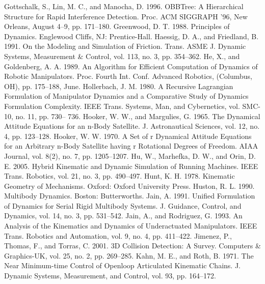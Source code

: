 Gottschalk, S., Lin, M. C., and Manocha, D. 1996. OBBTree: A Hierarchical Structure for Rapid Interference Detection. Proc. ACM SIGGRAPH ’96, New Orleans, August 4–9, pp. 171–180. Greenwood, D. T. 1988. Principles of Dynamics. Englewood Cliffs, NJ: Prentice-Hall. Haessig, D. A., and Friedland, B. 1991. On the Modeling and Simulation of Friction. Trans. ASME J. Dynamic Systems, Measurement \& Control, vol. 113, no. 3, pp. 354–362. He, X., and Goldenberg, A. A. 1989. An Algorithm for Efficient Computation of Dynamics of Robotic Manipulators. Proc. Fourth Int. Conf. Advanced Robotics, (Columbus, OH), pp. 175–188, June. Hollerbach, J. M. 1980. A Recursive Lagrangian Formulation of Manipulator Dynamics and a Comparative Study of Dynamics Formulation Complexity. IEEE Trans. Systems, Man, and Cybernetics, vol. SMC-10, no. 11, pp. 730– 736. Hooker, W. W., and Margulies, G. 1965. The Dynamical Attitude Equations for an n-Body Satellite. J. Astronautical Sciences, vol. 12, no. 4, pp. 123–128. Hooker, W. W. 1970. A Set of r Dynamical Attitude Equations for an Arbitrary n-Body Satellite having r Rotational Degrees of Freedom. AIAA Journal, vol. 8(2), no. 7, pp. 1205–1207. Hu, W., Marhefka, D. W., and Orin, D. E. 2005. Hybrid Kinematic and Dynamic Simulation of Running Machines. IEEE Trans. Robotics, vol. 21, no. 3, pp. 490–497. Hunt, K. H. 1978. Kinematic Geometry of Mechanisms. Oxford: Oxford University Press. Huston, R. L. 1990. Multibody Dynamics. Boston: Butterworths. Jain, A. 1991. Unified Formulation of Dynamics for Serial Rigid Multibody Systems. J. Guidance, Control, and Dynamics, vol. 14, no. 3, pp. 531–542. Jain, A., and Rodriguez, G. 1993. An Analysis of the Kinematics and Dynamics of Underactuated Manipulators. IEEE Trans. Robotics and Automation, vol. 9, no. 4, pp. 411–422. Jimenez, P., Thomas, F., and Torras, C. 2001. 3D Collision Detection: A Survey. Computers \& Graphics-UK, vol. 25, no. 2, pp. 269–285. Kahn, M. E., and Roth, B. 1971. The Near Minimum-time Control of Openloop Articulated Kinematic Chains. J. Dynamic Systems, Measurement, and Control, vol. 93, pp. 164–172.

